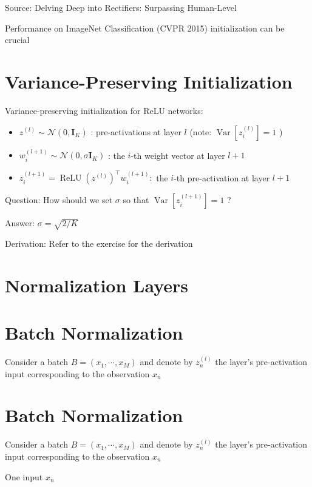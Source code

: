 Source: Delving Deep into Rectifiers: Surpassing Human-Level

Performance on ImageNet Classification (CVPR 2015) initialization can be crucial

\section*{Variance-Preserving Initialization}
Variance-preserving initialization for ReLU networks:

\begin{itemize}
  \item $z^{(l)} \sim \mathcal{N}\left(0, \mathbf{I}_{K}\right)$ : pre-activations at layer $l$ (note: $\operatorname{Var}\left[z_{i}^{(l)}\right]=1$ )

  \item $w_{i}^{(l+1)} \sim \mathcal{N}\left(0, \sigma \mathbf{I}_{K}\right)$ : the $i$-th weight vector at layer $l+1$

  \item $z_{i}^{(l+1)}=\operatorname{ReLU}\left(z^{(l)}\right)^{\top} w_{i}^{(l+1)}:$ the $i$-th pre-activation at layer $l+1$

\end{itemize}

Question: How should we set $\sigma$ so that $\operatorname{Var}\left[z_{i}^{(l+1)}\right]=1$ ?

Answer: $\sigma=\sqrt{2 / K}$

Derivation: Refer to the exercise for the derivation

\section*{Normalization Layers}
\section*{Batch Normalization}
Consider a batch $B=\left(x_{1}, \cdots, x_{M}\right)$ and denote by $z_{n}^{(l)}$ the layer's pre-activation input corresponding to the observation $x_{n}$

\section*{Batch Normalization}
Consider a batch $B=\left(x_{1}, \cdots, x_{M}\right)$ and denote by $z_{n}^{(l)}$ the layer's pre-activation input corresponding to the observation $x_{n}$

One input $x_{n}$

